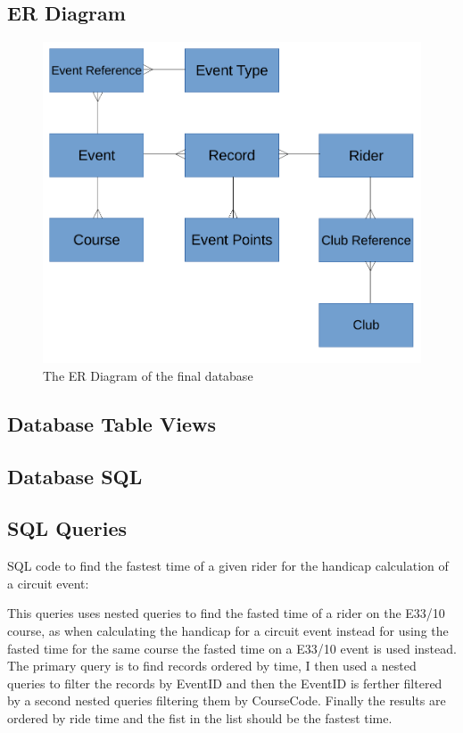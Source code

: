 \subsection{ER Diagram}
\begin{figure}[H]
\includegraphics[width=\textwidth]{./Maintenance/ER.pdf}
\caption{The ER Diagram of the final database} \label{fig:ER_Fin}
\end{figure}

\subsection{Database Table Views}
\clearpage

\begin{landscape}
\subsection{Database SQL}
\end{landscape}
\subsection{SQL Queries}

SQL code to find the fastest time of a given rider for the handicap calculation of a circuit event:


This queries uses nested queries to find the fasted time of a rider on the E33/10 course, as when calculating the handicap for a circuit event instead for using the fasted time for the same course the fasted time on a E33/10 event is used instead. The primary query is to find records ordered by time, I then used a nested queries to filter the records by EventID and then the EventID is ferther filtered by a second nested queries filtering them by CourseCode. Finally the results are ordered by ride time and the fist in the list should be the fastest time.

